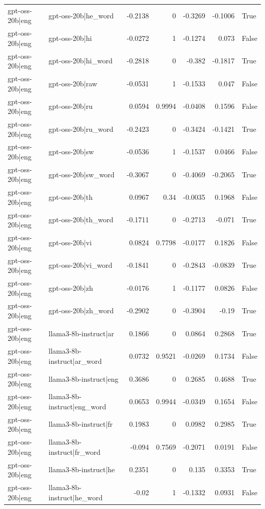 \begin{table}
\begin{tabular}{l l r r r r l}
gpt-oss-20b|eng & gpt-oss-20b|he_word & -0.2138 & 0 & -0.3269 & -0.1006 & True \\
gpt-oss-20b|eng & gpt-oss-20b|hi & -0.0272 & 1 & -0.1274 & 0.073 & False \\
gpt-oss-20b|eng & gpt-oss-20b|hi_word & -0.2818 & 0 & -0.382 & -0.1817 & True \\
gpt-oss-20b|eng & gpt-oss-20b|raw & -0.0531 & 1 & -0.1533 & 0.047 & False \\
gpt-oss-20b|eng & gpt-oss-20b|ru & 0.0594 & 0.9994 & -0.0408 & 0.1596 & False \\
gpt-oss-20b|eng & gpt-oss-20b|ru_word & -0.2423 & 0 & -0.3424 & -0.1421 & True \\
gpt-oss-20b|eng & gpt-oss-20b|sw & -0.0536 & 1 & -0.1537 & 0.0466 & False \\
gpt-oss-20b|eng & gpt-oss-20b|sw_word & -0.3067 & 0 & -0.4069 & -0.2065 & True \\
gpt-oss-20b|eng & gpt-oss-20b|th & 0.0967 & 0.34 & -0.0035 & 0.1968 & False \\
gpt-oss-20b|eng & gpt-oss-20b|th_word & -0.1711 & 0 & -0.2713 & -0.071 & True \\
gpt-oss-20b|eng & gpt-oss-20b|vi & 0.0824 & 0.7798 & -0.0177 & 0.1826 & False \\
gpt-oss-20b|eng & gpt-oss-20b|vi_word & -0.1841 & 0 & -0.2843 & -0.0839 & True \\
gpt-oss-20b|eng & gpt-oss-20b|zh & -0.0176 & 1 & -0.1177 & 0.0826 & False \\
gpt-oss-20b|eng & gpt-oss-20b|zh_word & -0.2902 & 0 & -0.3904 & -0.19 & True \\
gpt-oss-20b|eng & llama3-8b-instruct|ar & 0.1866 & 0 & 0.0864 & 0.2868 & True \\
gpt-oss-20b|eng & llama3-8b-instruct|ar_word & 0.0732 & 0.9521 & -0.0269 & 0.1734 & False \\
gpt-oss-20b|eng & llama3-8b-instruct|eng & 0.3686 & 0 & 0.2685 & 0.4688 & True \\
gpt-oss-20b|eng & llama3-8b-instruct|eng_word & 0.0653 & 0.9944 & -0.0349 & 0.1654 & False \\
gpt-oss-20b|eng & llama3-8b-instruct|fr & 0.1983 & 0 & 0.0982 & 0.2985 & True \\
gpt-oss-20b|eng & llama3-8b-instruct|fr_word & -0.094 & 0.7569 & -0.2071 & 0.0191 & False \\
gpt-oss-20b|eng & llama3-8b-instruct|he & 0.2351 & 0 & 0.135 & 0.3353 & True \\
gpt-oss-20b|eng & llama3-8b-instruct|he_word & -0.02 & 1 & -0.1332 & 0.0931 & False \\

\end{tabular}
\end{table}
